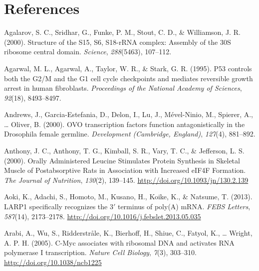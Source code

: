 \documentclass[12pt,oneside]{reedthesis}
\newlength{\cslhangindent}
\newenvironment{cslreferences}%
  {\setlength{\parindent}{0pt}%
  \everypar{\setlength{\hangindent}{\cslhangindent}}\ignorespaces}%
  {\par}
\begin{document}
\backmatter

\hypertarget{references}{%
\chapter*{References}\label{references}}


\noindent

\setlength{\parindent}{-0.20in}
\setlength{\leftskip}{0.20in}
\setlength{\parskip}{8pt}

\hypertarget{refs}{}
\begin{cslreferences}
\leavevmode\hypertarget{ref-Agalarov2000}{}%
Agalarov, S. C., Sridhar, G., Funke, P. M., Stout, C. D., \& Williamson, J. R. (2000). Structure of the S15, S6, S18-rRNA complex: Assembly of the 30S ribosome central domain. \emph{Science}, \emph{288}(5463), 107--112.

\leavevmode\hypertarget{ref-Agarwal1995a}{}%
Agarwal, M. L., Agarwal, A., Taylor, W. R., \& Stark, G. R. (1995). P53 controls both the G2/M and the G1 cell cycle checkpoints and mediates reversible growth arrest in human fibroblasts. \emph{Proceedings of the National Academy of Sciences}, \emph{92}(18), 8493--8497.

\leavevmode\hypertarget{ref-Andrews2000a}{}%
Andrews, J., Garcia-Estefania, D., Delon, I., Lu, J., Mével-Ninio, M., Spierer, A., \ldots{} Oliver, B. (2000). OVO transcription factors function antagonistically in the Drosophila female germline. \emph{Development (Cambridge, England)}, \emph{127}(4), 881--892.

\leavevmode\hypertarget{ref-anthonyOrallyAdministeredLeucine2000}{}%
Anthony, J. C., Anthony, T. G., Kimball, S. R., Vary, T. C., \& Jefferson, L. S. (2000). Orally Administered Leucine Stimulates Protein Synthesis in Skeletal Muscle of Postabsorptive Rats in Association with Increased eIF4F Formation. \emph{The Journal of Nutrition}, \emph{130}(2), 139--145. \url{http://doi.org/10.1093/jn/130.2.139}

\leavevmode\hypertarget{ref-aokiLARP1SpecificallyRecognizes2013}{}%
Aoki, K., Adachi, S., Homoto, M., Kusano, H., Koike, K., \& Natsume, T. (2013). LARP1 specifically recognizes the 3\({'}\) terminus of poly(A) mRNA. \emph{FEBS Letters}, \emph{587}(14), 2173--2178. \url{http://doi.org/10.1016/j.febslet.2013.05.035}

\leavevmode\hypertarget{ref-arabiCMycAssociatesRibosomal2005}{}%
Arabi, A., Wu, S., Ridderstråle, K., Bierhoff, H., Shiue, C., Fatyol, K., \ldots{} Wright, A. P. H. (2005). C-Myc associates with ribosomal DNA and activates RNA polymerase I transcription. \emph{Nature Cell Biology}, \emph{7}(3), 303--310. \url{http://doi.org/10.1038/ncb1225}


\end{cslreferences}
\end{document}
